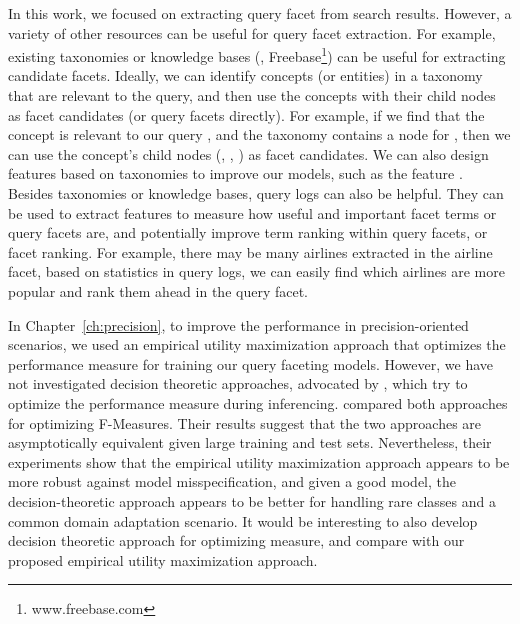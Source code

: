 In this work, we focused on extracting query facet from search results. However, a variety of other resources can be useful for query facet extraction. For example, existing taxonomies or knowledge bases (\eg, Freebase\footnote{www.freebase.com}) can be useful for extracting candidate facets. Ideally, we can identify concepts (or entities) in a taxonomy that are relevant to the query, and then use the concepts with their child nodes as facet candidates (or query facets directly). For example, if we find that the concept  is relevant to our query , and the taxonomy contains a node for , then we can use the concept's child nodes (, , ) as facet candidates. We can also design features based on taxonomies to improve our models, such as the feature . Besides taxonomies or knowledge bases, query logs can also be helpful. They can be used to extract 
features to measure how useful and important facet terms or query facets are, and potentially improve term ranking within query facets, or facet ranking. For example, there may be many airlines extracted in the airline facet, based on statistics in query logs, we can easily find which airlines are more popular and rank them ahead in the query facet.

In Chapter~\ref{ch:precision}, to improve the performance in precision-oriented scenarios, we used an empirical utility maximization approach that optimizes the performance measure for training our query faceting models. However, we have not investigated  decision theoretic approaches, advocated by \citet{lewis1995evaluating}, which try to optimize the performance measure during inferencing. \citet{nan2012optimizing} compared both approaches for optimizing F-Measures. Their results suggest that the two approaches are asymptotically equivalent given large training and test sets. Nevertheless, their experiments show that the empirical utility maximization approach appears to be more robust against model misspecification, and given a good model, the decision-theoretic approach appears to be better for handling rare classes and a common domain adaptation scenario. It would be interesting to also develop decision theoretic approach for optimizing \PRF measure, and compare with our proposed empirical utility maximization 
approach.


